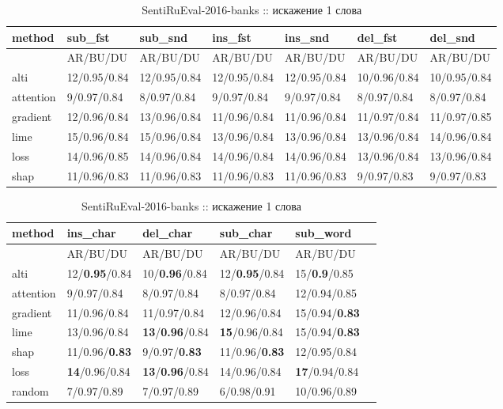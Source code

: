 \begin{table}
  \centering
  \caption*{SentiRuEval-2016-banks :: искажение 1 слова}
  {\renewcommand{\arraystretch}{1.5}
  {\fontsize{11pt}{10pt}\selectfont
  \begin{tabularx}{1.1\textwidth}{|l|X|X|X|X|X|X|}
    \hline
     method  & sub\_fst  & sub\_snd & ins\_fst  & ins\_snd & del\_fst  & del\_snd \\
    \hline
     & AR/BU/DU & AR/BU/DU & AR/BU/DU & AR/BU/DU & AR/BU/DU & AR/BU/DU \\
    \hline
     alti      & 12/0.95/0.84 & 12/0.95/0.84 & 12/0.95/0.84 & 12/0.95/0.84 & 10/0.96/0.84 & 10/0.95/0.84 \\
    \hline
     attention & 9/0.97/0.84  & 8/0.97/0.84 & 9/0.97/0.84  & 9/0.97/0.84 & 8/0.97/0.84  & 8/0.97/0.84 \\
    \hline
     gradient  & 12/0.96/0.84 & 13/0.96/0.84 & 11/0.96/0.84 & 11/0.96/0.84 & 11/0.97/0.84 & 11/0.97/0.85 \\
    \hline
     lime      & 15/0.96/0.84 & 15/0.96/0.84 & 13/0.96/0.84 & 13/0.96/0.84 & 13/0.96/0.84 & 14/0.96/0.84 \\
    \hline
     loss      & 14/0.96/0.85 & 14/0.96/0.84 & 14/0.96/0.84 & 14/0.96/0.84 & 13/0.96/0.84 & 13/0.96/0.84 \\
    \hline
     shap      & 11/0.96/0.83 & 11/0.96/0.83 & 11/0.96/0.83 & 11/0.96/0.83 & 9/0.97/0.83  & 9/0.97/0.83 \\
    \hline
    \end{tabularx}
    }
    }
\end{table}


\begin{table}[H]
  \centering
  \caption*{SentiRuEval-2016-banks :: искажение 1 слова}
  {\renewcommand{\arraystretch}{1.5}
  {\fontsize{11pt}{10pt}\selectfont
  \begin{tabularx}{0.85\textwidth}{|l|X|X|X|X|X|}
    \hline
     method    & ins\_char         & del\_char         & sub\_char         & sub\_word         \\
    \hline
     & AR/BU/DU  & AR/BU/DU  & AR/BU/DU  & AR/BU/DU \\
    \hline
     alti      & 12/\textbf{0.95}/0.84 & 10/\textbf{0.96}/0.84 & 12/\textbf{0.95}/0.84 & 15/\textbf{0.9}/0.85 \\
    \hline
     attention & 9/0.97/0.84  & 8/0.97/0.84  & 8/0.97/0.84  & 12/0.94/0.85 \\
    \hline
     gradient  & 11/0.96/0.84 & 11/0.97/0.84 & 12/0.96/0.84 & 15/0.94/\textbf{0.83} \\
    \hline
     lime      & 13/0.96/0.84 & \textbf{13}/\textbf{0.96}/0.84 & \textbf{15}/0.96/0.84 & 15/0.94/\textbf{0.83} \\
    \hline
     shap      & 11/0.96/\textbf{0.83} & 9/0.97/\textbf{0.83}  & 11/0.96/\textbf{0.83} & 12/0.95/0.84 \\
    \hline
     loss      & \textbf{14}/0.96/0.84 & \textbf{13}/\textbf{0.96}/0.84 & 14/0.96/0.84 & \textbf{17}/0.94/0.84 \\
    \hline
     random    & 7/0.97/0.89  & 7/0.97/0.89  & 6/0.98/0.91  & 10/0.96/0.89 \\
    \hline
    \end{tabularx}
    }
    }
\end{table}